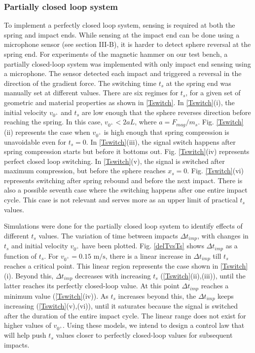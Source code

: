 \documentclass[letterpaper, 10 pt, conference]{ieeeconf}  %
\begin{document}
\subsubsection{Partially closed loop system}
\label{pcl}

To implement a perfectly closed loop system, sensing is required at both the spring and impact ends. While sensing at the impact end can be done using a microphone sensor (see section III-B), it is harder to detect sphere reversal at the spring end. For experiments of the magnetic hammer on our test bench, a partially closed-loop system was implemented with only impact end sensing using a microphone. The sensor detected each impact and triggered a reversal in the direction of the gradient force. The switching time $t_s$ at the spring end was manually set at different values. There are six regimes for $t_s$, for a given set of geometric and material properties as shown in \cref{Tswitch}. In \cref{Tswitch}(i), the initial velocity $v_{0^+}$ and $t_s$ are low enough that the sphere reverses direction before reaching the spring. In this case, $v_{0^+} < 2aL$, where $a=F_{mag}/m_s$. Fig. \ref{Tswitch}(ii) represents the case when $v_{0^+}$ is high enough that spring compression is unavoidable even for $t_s = 0$. In \cref{Tswitch}(iii), the signal switch happens after spring compression starts but before it bottoms out. Fig. \ref{Tswitch}(iv) represents perfect closed loop switching. In \cref{Tswitch}(v), the signal is switched after maximum compression, but before the sphere reaches $x_s=0$. Fig. \ref{Tswitch}(vi) represents switching after spring rebound and before the next impact. There is also a possible seventh case where the switching happens after one entire impact cycle. This case is not relevant and serves more as an upper limit of practical $t_s$ values. 

Simulations were done for the partially closed loop system to identify effects of different $t_s$ values. The variation of time between impacts $\Delta t_{imp}$, with changes in $t_s$ and initial velocity $v_{0^+}$ have been plotted. Fig. \ref{delTvsTs} shows $\Delta t_{imp}$ as a function of $t_s$. For $v_{0^+}=0.15\text{ m/s}$, there is a linear increase in $\Delta t_{imp}$ till $t_s$ reaches a critical point. This linear region represents the case shown in \cref{Tswitch}(i). Beyond this, $\Delta t_{imp}$ decreases with increasing $t_s$ (\cref{Tswitch}(ii),(iii)), until the latter reaches its perfectly closed-loop value. At this point $\Delta t_{imp}$ reaches a minimum value (\cref{Tswitch}(iv)). As $t_s$ increases beyond this, the $\Delta t_{imp}$ keeps increasing (\cref{Tswitch}(v),(vi)), until it saturates because the signal is switched after the duration of the entire impact cycle. The linear range does not exist for higher values of $v_{0^+}$. Using these models, we intend to design a control law that will help push $t_s$ values closer to perfectly closed-loop values for subsequent impacts.
\end{document}
